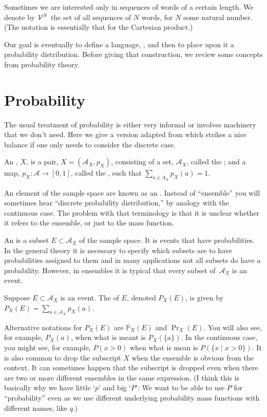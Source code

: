 \documentclass{article}
\begin{document}
Sometimes we are interested only in sequences of words of a certain length. We denote by $\mathcal{V}^N$ the set of all sequences of $N$ words, for $N$ some natural number. (The notation is essentially that for the Cartesian product.) 

Our goal is eventually to define a language, \lang, and then to place upon it a probability distribution. Before giving that construction, we review some concepts from probability theory.


\section{Probability}

The usual treatment of probability is either very informal or involves machinery that we don't need. Here we give a version adapted from \textcite{mackay2003information} which strikes a nice balance if one only needs to consider the discrete case. 

An , $X$, is a pair, $X= (\mathcal{A}_X,p_X)$, consisting of a set, $\mathcal{A}_X$, called the ; and a map, $p_X\colon \mathcal{A} \to [0,1]$, called the , such that $\sum_{a\in A_X} p_X(a) =1$. 

An element of the sample space are known as an . Instead of ``ensemble'' you will sometimes hear ``discrete probability distribution,'' by analogy with the continuous case.  The problem with that terminology is that it is unclear whether it refers to the ensemble, or just to the mass function.

An  is a subset $E\subset \mathcal{A}_X$ of the sample space.  It is events that have probabilities.  In the general theory it is necessary to specify which subsets are to have probabilities assigned to them and in many applications not all subsets do have a probability.  However, in ensembles it is typical that every subset of~$\mathcal{A}_X$ is an event.

Suppose $E\subset\mathcal{A}_X$ is an event.  The  of $E$, denoted $P_X(E)$, is given by $P_X(E) = \sum_{a\in\mathcal{A}_X} p_X(a)$.

Alternative notations for $P_X(E)$ are $\mathbb{P}_X(E)$ and $\operatorname{Pr}_X(E)$.  You will also see, for example, $P_X(a)$, when what is meant is $P_X(\{a\})$.  In the continuous case, you might see, for example, $P(x > 0)$ when what is mean is $P(\{x\mid x>0\})$. It is also common to drop the subscript $X$ when the ensemble is obvious from the context.  It can sometimes happen that the subscript is dropped even when there are two or more different ensembles in the same expression. (I think this is basically why we have little `$p$' and big `$P$': We want to be able to use $P$ for ``probability'' even as we use different underlying probability mass functions with different names, like $q$.)
\end{document}
